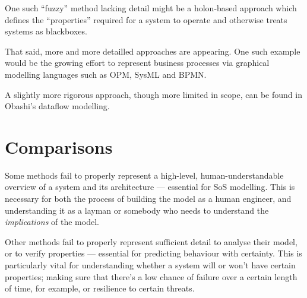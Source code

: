 One such ``fuzzy'' method lacking detail might be a holon-based approach which defines the ``properties'' required for a system to operate and otherwise treats systems as blackboxes. 
\par

That said, more and more detailled approaches are appearing. One such example would be the growing effort to represent business processes via graphical modelling languages such as OPM, SysML and BPMN.
\par

A slightly more rigorous approach, though more limited in scope, can be found in Obashi's dataflow modelling.
\par


\section{Comparisons}

Some methods fail to properly represent a high-level, human-understandable overview of a system and its architecture --- essential for SoS modelling.
This is necessary for both the process of building the model as a human engineer, and understanding it as a layman or somebody who needs to understand the \emph{implications} of the model.
\par

Other methods fail to properly represent sufficient detail to analyse their model, or to verify properties --- essential for predicting behaviour with certainty.
This is particularly vital for understanding whether a system will or won't have certain properties; making sure that there's a low chance of failure over a certain length of time, for example, or resilience to certain threats.
\par
